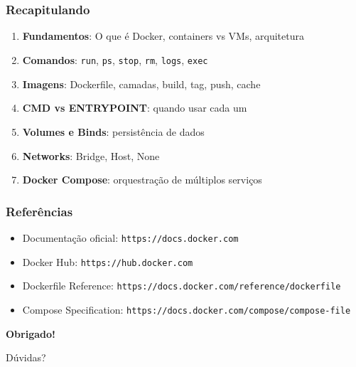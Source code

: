 \section*{}

\begin{frame}
  \frametitle{Recapitulando}
  \begin{enumerate}
    \item \textbf{Fundamentos}: O que é Docker, containers vs VMs, arquitetura
    \item \textbf{Comandos}: \texttt{run}, \texttt{ps}, \texttt{stop}, \texttt{rm}, \texttt{logs}, \texttt{exec}
    \item \textbf{Imagens}: Dockerfile, camadas, build, tag, push, cache
    \item \textbf{CMD vs ENTRYPOINT}: quando usar cada um
    \item \textbf{Volumes e Binds}: persistência de dados
    \item \textbf{Networks}: Bridge, Host, None
    \item \textbf{Docker Compose}: orquestração de múltiplos serviços
  \end{enumerate}
\end{frame}

\begin{frame}
  \frametitle{Referências}
  \begin{itemize}
    \item Documentação oficial: \texttt{https://docs.docker.com}
    \item Docker Hub: \texttt{https://hub.docker.com}
    \item Dockerfile Reference: \texttt{https://docs.docker.com/reference/dockerfile}
    \item Compose Specification: \texttt{https://docs.docker.com/compose/compose-file}
  \end{itemize}
\end{frame}

\begin{frame}
  \begin{center}
    \Huge \textbf{Obrigado!}

    \vspace{1em}
    \Large Dúvidas?
  \end{center}
\end{frame}
